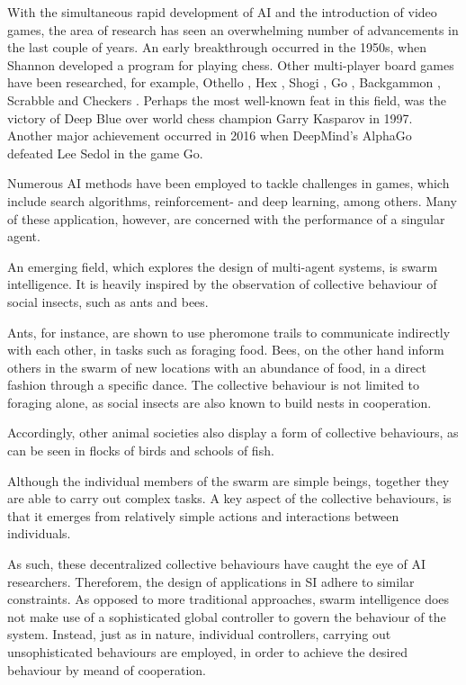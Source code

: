 With the simultaneous rapid development of AI and the introduction of video games, 
the area of research has seen an overwhelming number of advancements in the last couple of years.
An early breakthrough occurred in the 1950s, when 
Shannon \cite{shannon1950xxii} 
developed a program for playing chess.
Other multi-player board games have been researched, for example, 
Othello \cite{buro2002improving}, 
Hex \cite{anshelevich2002hierarchical}, 
Shogi \cite{iida2002computer}, 
Go \cite{muller2002computer}, 
Backgammon \cite{tesauro2002programming}, 
Scrabble \cite{sheppard2002world} and 
Checkers \cite{chellapilla1999evolving}. 
Perhaps the most well-known feat in this field, 
was the victory of Deep Blue over world chess champion Garry Kasparov in 1997.
Another major achievement occurred in 2016 when DeepMind's AlphaGo defeated Lee Sedol in the game Go.

Numerous AI methods have been employed to tackle challenges in games, 
which include search algorithms, reinforcement- and deep learning, among others.
Many of these application, however, are concerned with the performance of a singular agent.

An emerging field, which explores the design of multi-agent systems, is swarm intelligence.
It is heavily inspired by the observation of collective behaviour of social insects, 
such as ants and bees.

Ants, for instance, are shown to use pheromone trails to communicate indirectly with each other, 
in tasks such as foraging food. 
Bees, on the other hand inform others in the swarm of new locations with an abundance of food, 
in a direct fashion through a specific dance.
The collective behaviour is not limited to foraging alone, 
as social insects are also known to build nests in cooperation.

Accordingly, other animal societies also display a form of collective behaviours, 
as can be seen in flocks of birds and schools of fish.

Although the individual members of the swarm are simple beings, 
together they are able to carry out complex tasks.
A key aspect of the collective behaviours, 
is that it emerges from relatively simple actions and interactions between individuals.

As such, these decentralized collective behaviours have caught the eye of AI researchers.
Thereforem, the design of applications in SI adhere to similar constraints.
As opposed to more traditional approaches, 
swarm intelligence does not make use of a sophisticated global controller to govern the behaviour of the system.
Instead, just as in nature, individual controllers, 
carrying out unsophisticated behaviours are employed, 
in order to achieve the desired behaviour by meand of cooperation.


